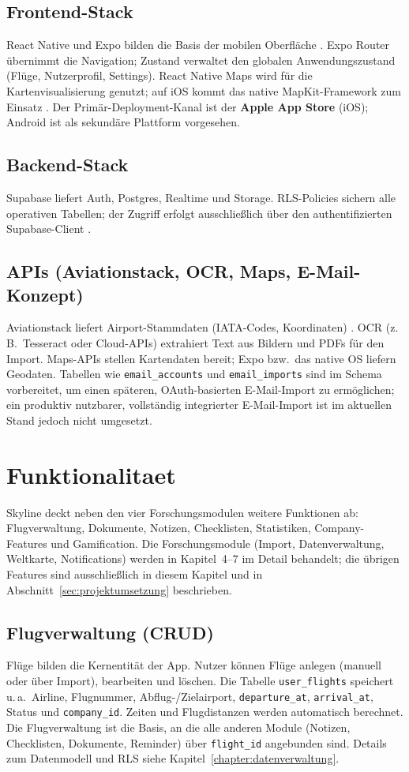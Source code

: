 \subsection{Frontend-Stack}
React Native und Expo bilden die Basis der mobilen Oberfläche
\cite{reactNative,expoDocs}. Expo Router übernimmt die Navigation; Zustand
verwaltet den globalen Anwendungszustand (Flüge, Nutzerprofil, Settings).
React Native Maps wird für die Kartenvisualisierung genutzt; auf iOS kommt
das native MapKit-Framework zum Einsatz \cite{reactNativeMaps}. Der
Primär-Deployment-Kanal ist der \textbf{Apple App Store} (iOS); Android ist
als sekundäre Plattform vorgesehen.

\subsection{Backend-Stack}
Supabase liefert Auth, Postgres, Realtime und Storage. RLS-Policies sichern
alle operativen Tabellen; der Zugriff erfolgt ausschließlich über den
authentifizierten Supabase-Client \cite{supabasePlatform,supabaseRLS,supabaseStorage}.

\subsection{APIs (Aviationstack, OCR, Maps, E-Mail-Konzept)}
Aviationstack liefert Airport-Stammdaten (IATA-Codes, Koordinaten)
\cite{aviationstack}. OCR (z.\,B.\ Tesseract oder Cloud-APIs) extrahiert Text
aus Bildern und PDFs für den Import. Maps-APIs stellen Kartendaten bereit;
Expo bzw.\ das native OS liefern Geodaten. Tabellen wie \texttt{email\_accounts}
und \texttt{email\_imports} sind im Schema vorbereitet, um einen späteren,
OAuth-basierten E-Mail-Import zu ermöglichen; ein produktiv nutzbarer,
vollständig integrierter E-Mail-Import ist im aktuellen Stand jedoch nicht
umgesetzt.
\section{Funktionalitaet}
Skyline deckt neben den vier Forschungsmodulen weitere Funktionen ab: Flugverwaltung,
Dokumente, Notizen, Checklisten, Statistiken, Company-Features und Gamification.
Die Forschungsmodule (Import, Datenverwaltung, Weltkarte, Notifications) werden
in Kapitel~4--7 im Detail behandelt; die übrigen Features sind ausschließlich
in diesem Kapitel und in Abschnitt~\ref{sec:projektumsetzung} beschrieben.

\subsection{Flugverwaltung (CRUD)}
Flüge bilden die Kernentität der App. Nutzer können Flüge anlegen (manuell oder
über Import), bearbeiten und löschen. Die Tabelle \texttt{user\_flights} speichert
u.\,a.\ Airline, Flugnummer, Abflug-/Zielairport, \texttt{departure\_at},
\texttt{arrival\_at}, Status und \texttt{company\_id}. Zeiten und Flugdistanzen
werden automatisch berechnet. Die Flugverwaltung ist die Basis, an die alle
anderen Module (Notizen, Checklisten, Dokumente, Reminder) über \texttt{flight\_id}
angebunden sind. Details zum Datenmodell und RLS siehe
Kapitel~\ref{chapter:datenverwaltung}.

